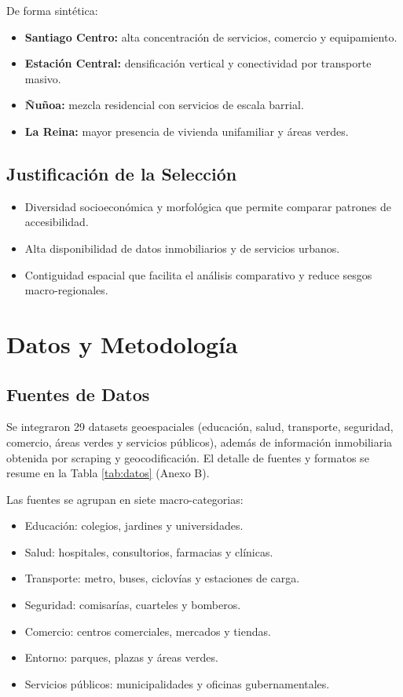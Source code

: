 \documentclass[11pt,letterpaper]{article}
\begin{document}
De forma sintética:
\begin{itemize}
    \item \textbf{Santiago Centro:} alta concentración de servicios, comercio y equipamiento.
    \item \textbf{Estación Central:} densificación vertical y conectividad por transporte masivo.
    \item \textbf{Ñuñoa:} mezcla residencial con servicios de escala barrial.
    \item \textbf{La Reina:} mayor presencia de vivienda unifamiliar y áreas verdes.
\end{itemize}

\subsection{Justificación de la Selección}
\begin{itemize}
    \item Diversidad socioeconómica y morfológica que permite comparar patrones de accesibilidad.
    \item Alta disponibilidad de datos inmobiliarios y de servicios urbanos.
    \item Contiguidad espacial que facilita el análisis comparativo y reduce sesgos macro-regionales.
\end{itemize}
\section{Datos y Metodología}

\subsection{Fuentes de Datos}
Se integraron 29 datasets geoespaciales (educación, salud, transporte, seguridad, comercio, áreas verdes y servicios públicos), además de información inmobiliaria obtenida por scraping y geocodificación. El detalle de fuentes y formatos se resume en la Tabla \ref{tab:datos} (Anexo B).

Las fuentes se agrupan en siete macro-categorias:
\begin{itemize}
    \item Educación: colegios, jardines y universidades.
    \item Salud: hospitales, consultorios, farmacias y clínicas.
    \item Transporte: metro, buses, ciclovías y estaciones de carga.
    \item Seguridad: comisarías, cuarteles y bomberos.
    \item Comercio: centros comerciales, mercados y tiendas.
    \item Entorno: parques, plazas y áreas verdes.
    \item Servicios públicos: municipalidades y oficinas gubernamentales.
\end{itemize}
\end{document}
